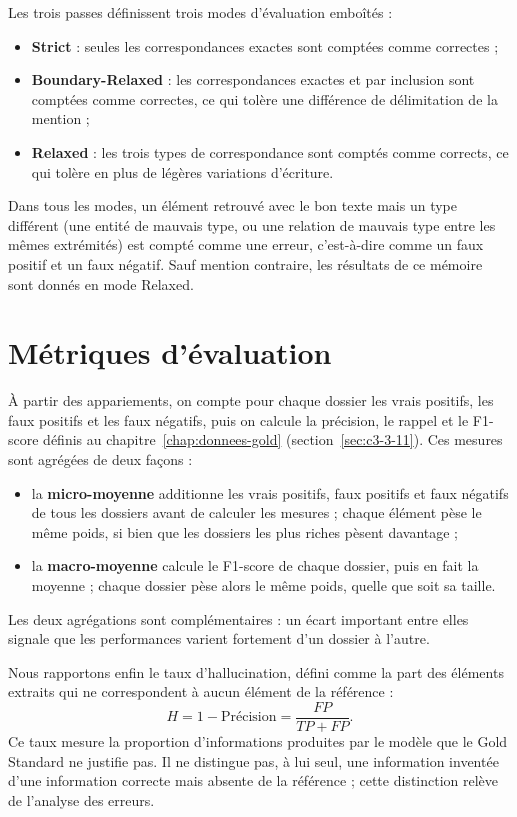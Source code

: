 Les trois passes définissent trois modes d'évaluation emboîtés :
\begin{itemize}
  \item \textbf{Strict} : seules les correspondances exactes sont comptées comme correctes ;
  \item \textbf{Boundary-Relaxed} : les correspondances exactes et par inclusion sont comptées comme correctes, ce qui tolère une différence de délimitation de la mention ;
  \item \textbf{Relaxed} : les trois types de correspondance sont comptés comme corrects, ce qui tolère en plus de légères variations d'écriture.
\end{itemize}
Dans tous les modes, un élément retrouvé avec le bon texte mais un type différent (une entité de mauvais type, ou une relation de mauvais type entre les mêmes extrémités) est compté comme une erreur, c'est-à-dire comme un faux positif et un faux négatif. Sauf mention contraire, les résultats de ce mémoire sont donnés en mode Relaxed.

\section{Métriques d'évaluation}\label{sec:c4-metriques}

À partir des appariements, on compte pour chaque dossier les vrais positifs, les faux positifs et les faux négatifs, puis on calcule la précision, le rappel et le F1-score définis au chapitre~\ref{chap:donnees-gold} (section~\ref{sec:c3-3-11}). Ces mesures sont agrégées de deux façons :
\begin{itemize}
  \item la \textbf{micro-moyenne} additionne les vrais positifs, faux positifs et faux négatifs de tous les dossiers avant de calculer les mesures ; chaque élément pèse le même poids, si bien que les dossiers les plus riches pèsent davantage ;
  \item la \textbf{macro-moyenne} calcule le F1-score de chaque dossier, puis en fait la moyenne ; chaque dossier pèse alors le même poids, quelle que soit sa taille.
\end{itemize}
Les deux agrégations sont complémentaires : un écart important entre elles signale que les performances varient fortement d'un dossier à l'autre.

Nous rapportons enfin le taux d'hallucination, défini comme la part des éléments extraits qui ne correspondent à aucun élément de la référence :
\begin{equation}
H = 1 - \text{Précision} = \frac{FP}{TP + FP}.
\end{equation}
Ce taux mesure la proportion d'informations produites par le modèle que le Gold Standard ne justifie pas. Il ne distingue pas, à lui seul, une information inventée d'une information correcte mais absente de la référence ; cette distinction relève de l'analyse des erreurs.


